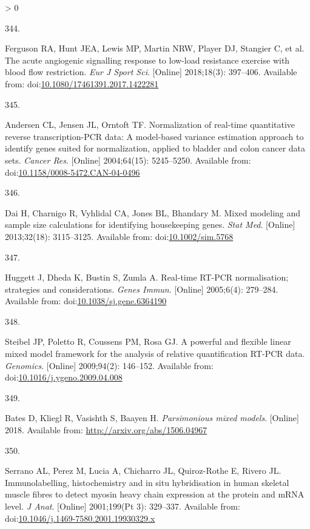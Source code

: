 \documentclass[twoside,10pt]{gihclass} %
\newlength{\cslhangindent}
\newlength{\csllabelwidth}
\newenvironment{CSLReferences}[3] %
 {%
  \setlength{\parindent}{0pt}
  \ifodd #1 \everypar{\setlength{\hangindent}{\cslhangindent}}\ignorespaces\fi
  \ifnum #2 > 0
  \setlength{\parskip}{#2\baselineskip}
  \fi
 }%
 {}
\newcommand{\CSLLeftMargin}[1]{\parbox[t]{\maxof{\widthof{#1}}{\csllabelwidth}}{#1}}
\newcommand{\CSLRightInline}[1]{\parbox[t]{\linewidth}{#1}}
\begin{document}
\begin{CSLReferences}{0}{0}
\leavevmode\hypertarget{ref-RN2087}{}%
\CSLLeftMargin{344. }
\CSLRightInline{Ferguson RA, Hunt JEA, Lewis MP, Martin NRW, Player DJ, Stangier C, et al. The acute angiogenic signalling response to low-load resistance exercise with blood flow restriction. \emph{Eur J Sport Sci}. {[}Online{]} 2018;18(3): 397--406. Available from: doi:\href{https://doi.org/10.1080/17461391.2017.1422281}{10.1080/17461391.2017.1422281}}

\leavevmode\hypertarget{ref-RN1772}{}%
\CSLLeftMargin{345. }
\CSLRightInline{Andersen CL, Jensen JL, Orntoft TF. Normalization of real-time quantitative reverse transcription-PCR data: A model-based variance estimation approach to identify genes suited for normalization, applied to bladder and colon cancer data sets. \emph{Cancer Res}. {[}Online{]} 2004;64(15): 5245--5250. Available from: doi:\href{https://doi.org/10.1158/0008-5472.CAN-04-0496}{10.1158/0008-5472.CAN-04-0496}}

\leavevmode\hypertarget{ref-RN1771}{}%
\CSLLeftMargin{346. }
\CSLRightInline{Dai H, Charnigo R, Vyhlidal CA, Jones BL, Bhandary M. Mixed modeling and sample size calculations for identifying housekeeping genes. \emph{Stat Med}. {[}Online{]} 2013;32(18): 3115--3125. Available from: doi:\href{https://doi.org/10.1002/sim.5768}{10.1002/sim.5768}}

\leavevmode\hypertarget{ref-RN1984}{}%
\CSLLeftMargin{347. }
\CSLRightInline{Huggett J, Dheda K, Bustin S, Zumla A. Real-time RT-PCR normalisation; strategies and considerations. \emph{Genes Immun}. {[}Online{]} 2005;6(4): 279--284. Available from: doi:\href{https://doi.org/10.1038/sj.gene.6364190}{10.1038/sj.gene.6364190}}

\leavevmode\hypertarget{ref-RN1154}{}%
\CSLLeftMargin{348. }
\CSLRightInline{Steibel JP, Poletto R, Coussens PM, Rosa GJ. A powerful and flexible linear mixed model framework for the analysis of relative quantification RT-PCR data. \emph{Genomics}. {[}Online{]} 2009;94(2): 146--152. Available from: doi:\href{https://doi.org/10.1016/j.ygeno.2009.04.008}{10.1016/j.ygeno.2009.04.008}}

\leavevmode\hypertarget{ref-bates2018parsimonious}{}%
\CSLLeftMargin{349. }
\CSLRightInline{Bates D, Kliegl R, Vasishth S, Baayen H. \emph{Parsimonious mixed models}. {[}Online{]} 2018. Available from: \url{http://arxiv.org/abs/1506.04967}}

\leavevmode\hypertarget{ref-RN2444}{}%
\CSLLeftMargin{350. }
\CSLRightInline{Serrano AL, Perez M, Lucia A, Chicharro JL, Quiroz-Rothe E, Rivero JL. Immunolabelling, histochemistry and in situ hybridisation in human skeletal muscle fibres to detect myosin heavy chain expression at the protein and mRNA level. \emph{J Anat}. {[}Online{]} 2001;199(Pt 3): 329--337. Available from: doi:\href{https://doi.org/10.1046/j.1469-7580.2001.19930329.x}{10.1046/j.1469-7580.2001.19930329.x}}


\end{CSLReferences}
\end{document}
